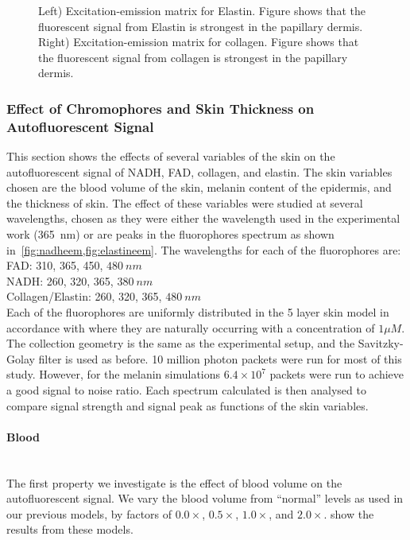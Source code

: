 \begin{figure}[!htbp]
    \centering
    \caption{Left) Excitation-emission matrix for Elastin. Figure shows that the fluorescent signal from Elastin is strongest in the papillary dermis.
    Right) Excitation-emission matrix for collagen. Figure shows that the fluorescent signal from collagen is strongest in the papillary dermis.}%
    \label{fig:elastineem}%
\end{figure}


\FloatBarrier
\subsubsection*{Effect of Chromophores and Skin Thickness on Autofluorescent Signal}

This section shows the effects of several variables of the skin on the autofluorescent signal of NADH, FAD, collagen, and elastin.
The skin variables chosen are the blood volume of the skin, melanin content of the epidermis, and the thickness of skin.
The effect of these variables were studied at several wavelengths, chosen as they were either the wavelength used in the experimental work (365~nm) or are peaks in the fluorophores spectrum as shown in~\cref{fig:nadheem,fig:elastineem}. 
The wavelengths for each of the fluorophores are:\\

\noindent FAD: 310, 365, 450, $480~nm$\\
NADH: 260, 320, 365, $380~nm$\\
Collagen/Elastin: 260, 320, 365, $480~nm$\\

Each of the fluorophores are uniformly distributed in the 5 layer skin model in accordance with where they are naturally occurring with a concentration of $1\mu M$.
The collection geometry is the same as the experimental setup, and the Savitzky-Golay filter is used as before.
10 million photon packets were run for most of this study.
However, for the melanin simulations $6.4\times10^7$ packets were run to achieve a good signal to noise ratio.
Each spectrum calculated is then analysed to compare signal strength and signal peak as functions of the skin variables.

\paragraph*{Blood}\hspace{0pt}\\
The first property we investigate is the effect of blood volume on the autofluorescent signal.
We vary the blood volume from ``normal'' levels as used in our previous models, by factors of $0.0\times$, $0.5\times$, $1.0\times$, and $2.0\times$.
 show the results from these models.

